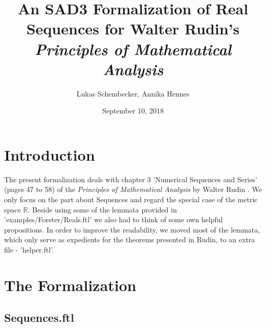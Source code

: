 \documentclass{article}
\begin{document}
\title{An SAD3 Formalization of Real Sequences for Walter Rudin's
\it{Principles of Mathematical Analysis}}

\author{Lukas Schembecker, Annika Hennes}

\date{September 10, 2018}

\maketitle


\section{Introduction}
The present formalization deals with chapter 3 'Numerical Sequences and Series' (pages 47 to 58) of the {\it Principles of Mathematical Analysis} by Walter Rudin \cite{Rudin}. We only focus on the part about Sequences and regard the special case of the metric space $\mathbb{R}$. Beside using some of the lemmata provided in 'examples/Forster/Reals.ftl' we also had to think of some own helpful propositions. In order to improve the readability, we moved most of the lemmata, which only serve as expedients for the theorems presented in Rudin, to an extra file - 'helper.ftl'.


\section{The Formalization}
\subsection{Sequences.ftl}
\end{document}
